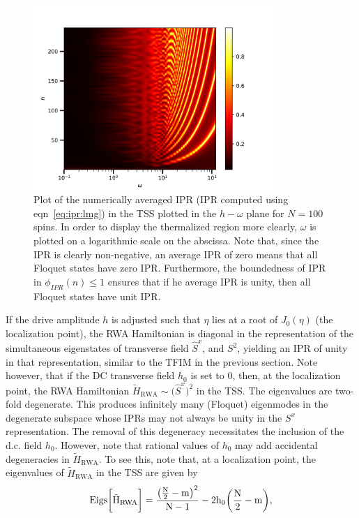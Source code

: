 \documentclass[%
reprint,
superscriptaddress,
linenumbers,
amsmath,amssymb,
aps,
prb,
showkeys,
]{revtex4-2}
\begin{document}
		\begin{figure}[t!]
	\centering
	\includegraphics[width=9.3cm]{wh_phasespace.jpeg }
	\caption{Plot of the numerically averaged IPR (IPR computed using eqn~\ref{eq:ipr:lmg}) in the TSS plotted in the $h-\omega$ plane for $N=100$ spins. In order to display the thermalized region more clearly, $\omega$ is plotted on a logarithmic scale on the abscissa. Note that, since the IPR is clearly non-negative, an average IPR of zero means that all Floquet states have zero IPR. Furthermore, the boundedness of IPR in $\phi_{IPR}(n) \leq 1$ ensures that if he average IPR is unity, then all Floquet states have unit IPR.}
	\label{fig:lmg_phasediag}
	\end{figure}
	If the drive amplitude $h$ is adjusted such that $\eta$ lies at a root of $J_0(\eta)$ (the localization point), the RWA Hamiltonian is diagonal in the representation of the simultaneous eigenstates of transverse field $\hat{S}^x$, and $S^2$, yielding an IPR of unity in that representation, similar to the TFIM in the previous section. Note however, that if the DC transverse field $h_0$ is set to $0$, then, at the localization point, the RWA Hamiltonian $\tilde{H}_{\mathrm{RWA}}\sim
	\big(\hat{S}^x\big)^2$ in the TSS. The eigenvalues are two-fold degenerate. This produces infinitely many (Floquet) eigenmodes in the degenerate subspace whose IPRs may not always be unity in the $S^x$ representation. The removal of this degeneracy necessitates the inclusion of the d.c. field $h_0$. However, note that rational values of $h_0$
	 may add accidental degeneracies in $\tilde{H}_{\mathrm{RWA}}$. To see this, note that, at a localization point, the eigenvalues of $\tilde{H}_{\mathrm{RWA}}$ in the TSS are given by
	\begin{equation}
	\rm{Eigs}\bigg[\tilde{H}_{\mathrm{RWA}}\bigg] = \frac{\big(\frac{N}{2}-m\big)^2}{N-1} - 2h_0 \bigg(\frac{N}{2}-m\bigg),
	\end{equation}
\end{document}
